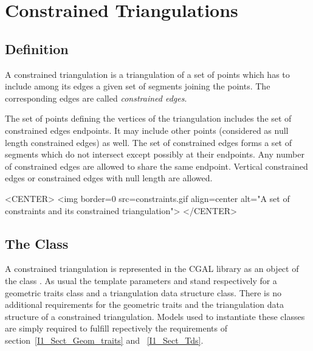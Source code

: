 \section{Constrained Triangulations}
\label{I1_Sect_Constrained}


\subsection{Definition}
A constrained triangulation is a triangulation of a set of points
which has to include among its edges 
a given set of segments joining the points. The corresponding 
edges are called {\em constrained edges}. 

The set of points defining the vertices of the triangulation
includes the set of constrained edges endpoints. It may include other points
(considered as null length constrained edges) as well.  The set of
constrained edges forms a set of segments which do not intersect
except possibly at their endpoints.  Any number of constrained edges
are allowed to share the same endpoint.  Vertical constrained edges or
constrained edges with null length are allowed.


\begin{ccTexOnly}
\begin{center}   \end{center}
\end{ccTexOnly}
 
\begin{ccHtmlOnly}
<CENTER>
<img border=0 src=constraints.gif align=center alt="A set of
constraints and its constrained triangulation">
</CENTER>
\end{ccHtmlOnly}

\subsection{ The Class \protect {}}
A constrained triangulation is represented in the CGAL library as an
object of the class .
As usual the template parameters  and 
stand respectively for a geometric traits class and
a triangulation data structure class. There is no additional
requirements for the geometric traits and the triangulation data
structure of a constrained triangulation.
Models used to instantiate these classes are simply required
to fulfill repectively the requirements 
of section~\ref{I1_Sect_Geom_traits} and ~\ref{I1_Sect_Tds}.

